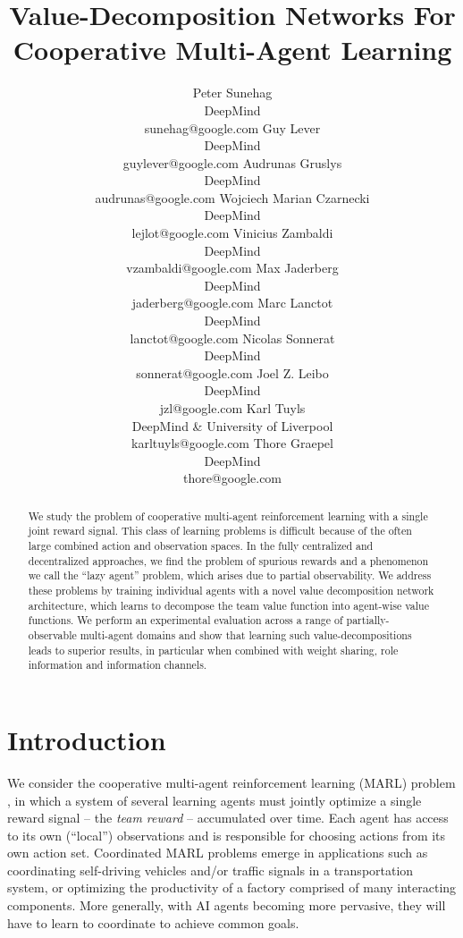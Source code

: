 \documentclass{article}
\title{Value-Decomposition Networks For Cooperative Multi-Agent Learning}
\author{
  Peter Sunehag\\DeepMind\\sunehag@google.com \And Guy Lever\\DeepMind\\guylever@google.com \And Audrunas Gruslys\\DeepMind\\audrunas@google.com \And Wojciech Marian Czarnecki\\DeepMind\\lejlot@google.com \And Vinicius Zambaldi\\DeepMind\\vzambaldi@google.com
  \And Max Jaderberg\\DeepMind\\jaderberg@google.com \And Marc Lanctot\\DeepMind\\lanctot@google.com \And Nicolas Sonnerat\\DeepMind\\sonnerat@google.com \And Joel Z. Leibo\\DeepMind\\jzl@google.com \And Karl Tuyls\\DeepMind \& University of Liverpool\\karltuyls@google.com \And Thore Graepel\\DeepMind\\thore@google.com 
}
\begin{document}
\maketitle

\begin{abstract}
We study the problem of cooperative multi-agent reinforcement learning with a single joint reward signal. This class of learning problems is difficult because of the often large combined action and observation spaces. In the fully centralized and decentralized approaches, we find the problem of spurious rewards and a phenomenon we call the ``lazy agent'' problem, which arises due to partial observability.  We  address these problems by training individual agents with a novel value decomposition network architecture, which learns to decompose the team value function into  agent-wise value functions. We perform an experimental evaluation across a range of partially-observable multi-agent domains and show that learning such value-decompositions leads to superior results, in particular when combined with weight sharing, role information and information channels. 
\end{abstract}


\section{Introduction}

We consider the cooperative multi-agent reinforcement learning (MARL) problem \citep{panait05,Busoniu08MARL,TuylsW12}, in which a system of several learning agents must jointly optimize a single reward signal -- the \emph{team reward} -- accumulated over time. Each agent has access to its own (``local'') observations and is responsible for choosing actions from its own action set. Coordinated MARL problems emerge in applications such as coordinating self-driving vehicles and/or traffic signals in a transportation system, or optimizing the productivity of a factory comprised of many interacting components. More generally, with AI agents becoming more pervasive, they will have to learn to coordinate to achieve common goals.
\end{document}
